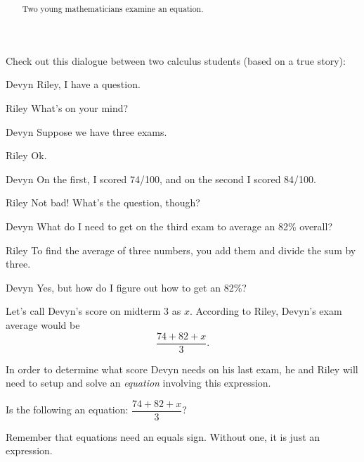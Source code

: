 \documentclass{ximera}
\title[Break-Ground:]{  }
\begin{document}
\begin{abstract}
  Two young mathematicians examine an equation.
\end{abstract}
\maketitle

Check out this dialogue between two calculus students (based on a true
story):

\begin{dialogue}
	\item[Devyn] Riley, I have a question.
	\item[Riley] What's on your mind?
	\item[Devyn] Suppose we have three exams.  
	\item[Riley]  Ok. 
	\item[Devyn] On the first, I scored 74/100, and on the second I scored 84/100.
	\item[Riley] Not bad!  What's the question, though?
	\item[Devyn] What do I need to get on the third exam to average an 82\% overall?
	\item[Riley] To find the average of three numbers, you add them and divide the sum by three.
	\item[Devyn] Yes, but how do I figure out how to get an 82\%?
\end{dialogue}

Let's call Devyn's score on midterm 3 as $x$.  According to Riley, Devyn's exam average
would be \[ \frac{74 + 82 + x}{3}. \]

In order to determine what score Devyn needs on his last exam, he and Riley will need to setup and solve an \emph{equation} involving this expression.


\begin{problem}
  Is the following an equation: $\displaystyle \dfrac{74 + 82 + x}{3}$?

  \begin{multipleChoice}
  \end{multipleChoice}

  \begin{feedback}
  Remember that equations need an equals sign.  Without one, it is just an expression.  
  \end{feedback}
\end{problem}



\end{document}
